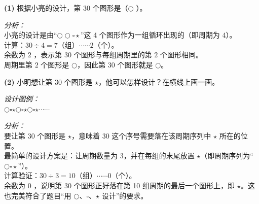 {\small
\textbf{(1)} 根据小亮的设计，第 30 个图形是（\quad \textbf{$\bigcirc$} \quad）。

\vspace{0.3cm}
\textit{分析：}\\
小亮的设计是由“$\bigcirc \bigcirc \square \star$”这 4 个图形作为一组循环出现的（即周期为 $4$）。\\
计算：$30 \div 4 = 7$（组）$\cdots\cdots 2$（个）。\\
余数为 $2$ ，表示第 $30$ 个图形与每组周期里的第 $2$ 个图形相同。\\
周期里第 $2$ 个图形是 $\bigcirc$，因此第 $30$ 个图形就是 $\bigcirc$。

\vspace{0.8cm}
\textbf{(2)} 小明想让第 30 个图形是 $\star$，他可以怎样设计？在横线上画一画。

\vspace{0.3cm}
\textit{设计图例：}\\
\underline{\quad \Large $\bigcirc$\quad$\square$\quad$\star$\quad$\bigcirc$\quad$\square$\quad$\star$\quad$\bigcirc$\quad$\square$\quad$\star$\quad$\cdots\cdots$ \quad}

\vspace{0.6cm}
\textit{分析：}\\
要让第 $30$ 个图形是 $\star$，意味着 $30$ 这个序号需要落在该周期序列中 $\star$ 所在的位置。\\
最简单的设计方案是：让周期数量为 $3$，并在每组的末尾放置 $\star$（即周期序列为“$\bigcirc\square\star$”）。\\
计算验证：$30 \div 3 = 10$（组）$\cdots\cdots 0$（个）。\\
余数为 $0$ ，说明第 $30$ 个图形正好落在第 10 组周期的最后一个图形上，即 $\star$。这也完美符合了题目“用 $\bigcirc$、$\square$、$\star$ 设计”的要求。
}



